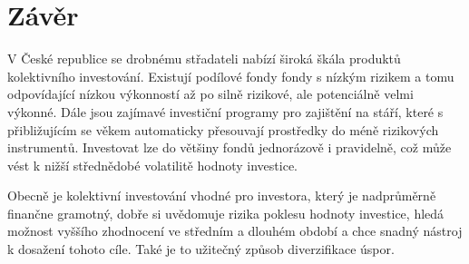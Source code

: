 \documentclass[a4paper,12pt]{article}
\begin{document}
	\section{Závěr}
		V České republice se drobnému střadateli nabízí široká škála produktů kolektivního investování. Existují podílové fondy fondy s nízkým rizikem a tomu odpovídající nízkou výkonností až po silně rizikové, ale potenciálně velmi výkonné. Dále jsou zajímavé investiční programy pro zajištění na stáří, které s přibližujícím se věkem automaticky přesouvají prostředky do méně rizikových instrumentů. Investovat lze do většiny fondů jednorázově i pravidelně, což může vést k nižší střednědobé volatilitě hodnoty investice.
		
		Obecně je kolektivní investování vhodné pro investora, který je nadprůměrně finančne gramotný,  dobře si uvědomuje rizika poklesu hodnoty investice, hledá možnost vyššího zhodnocení ve středním a dlouhém období a chce snadný nástroj k dosažení tohoto cíle. Také je to užitečný způsob diverzifikace úspor.
\clearpage
\appendix
\end{document}

